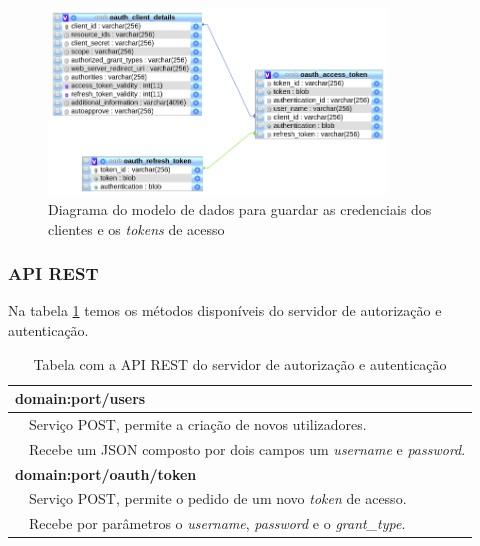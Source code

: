  \begin{figure}[H]
  \centering
  \includegraphics[width=0.8\textwidth]{imgs/auth-diagram.png}
  \caption[Diagrama do modelo de dados para guardar as credenciais dos clientes e os  \textit{tokens} de acesso]{Diagrama do modelo de dados para guardar as credenciais dos clientes e os  \textit{tokens} de acesso}
  
  \label{f:auth-diagram}
\end{figure}

\subsubsection{API REST}
\label{l:restapiAUTH}
Na tabela \ref{t:apirest-auth} temos os métodos disponíveis do servidor de autorização e autenticação.
\begin{table}[H]

\centering
\begin{tabularx}{1\textwidth}{|p{0.3cm} p{14.4cm}|}
\multicolumn{2}{l}{\textbf{domain:port/users}}  \\ \hline 
 & Serviço POST, permite a criação de novos utilizadores. \\
 & Recebe um JSON composto por dois campos um  \textit{username} e  \textit{password}. \\ \hline
\multicolumn{2}{l}{\textbf{domain:port/oauth/token}} \\ \hline
 & Serviço POST, permite o pedido de um novo  \textit{token} de acesso. \\
 & Recebe por parâmetros o  \textit{username},  \textit{password} e o  \textit{grant\_type}. \\ \hline
\end{tabularx}
\caption{Tabela com a API REST do servidor de autorização e autenticação}
\label{t:apirest-auth}
\end{table}

